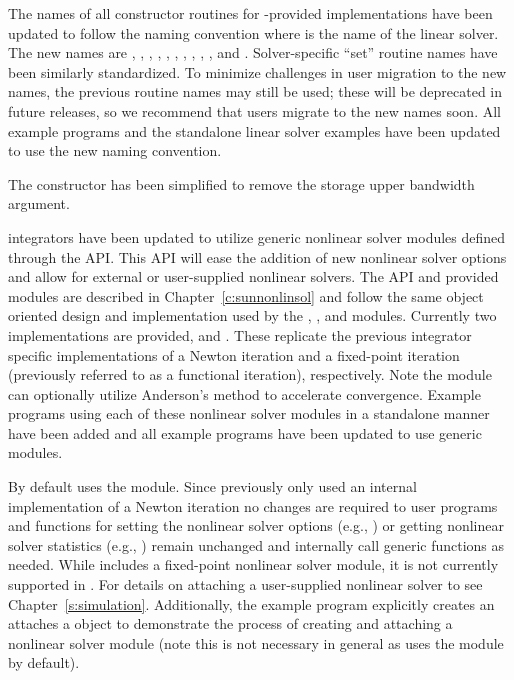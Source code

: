 The names of all constructor routines for {\sundials}-provided
{\sunlinsol} implementations have been updated to follow the naming convention
 where \id{*} is the name of the linear solver. The new names
are 
,
,
,
,\newline
{},
,
,
,
,
, and
.  Solver-specific ``set'' routine names have
been similarly standardized.  To minimize challenges in user migration
to the new names, the previous routine names may still be used; these
will be deprecated in future releases, so we recommend that users
migrate to the new names soon. All {\ida} example programs and the standalone
linear solver examples have been updated to use the new naming convention.

The  constructor has been simplified to remove the
storage upper bandwidth argument.

{\sundials} integrators have been updated to utilize generic nonlinear solver
modules defined through the {\sunnonlinsol} API. This API will ease the addition
of new nonlinear solver options and allow for external or user-supplied
nonlinear solvers. The {\sunnonlinsol} API and {\sundials} provided modules are
described in Chapter~\ref{c:sunnonlinsol} and follow the same object oriented
design and implementation used by the {\nvector}, {\sunmatrix}, and {\sunlinsol}
modules. Currently two {\sunnonlinsol} implementations are provided,
{\sunnonlinsolnewton} and {\sunnonlinsolfixedpoint}. These replicate the
previous integrator specific implementations of a Newton iteration and a
fixed-point iteration (previously referred to as a functional iteration),
respectively. Note the {\sunnonlinsolfixedpoint} module can optionally utilize
Anderson's method to accelerate convergence. Example programs using each of
these nonlinear solver modules in a standalone manner have been added and all
{\ida} example programs have been updated to use generic {\sunnonlinsol}
modules.

By default {\ida} uses the {\sunnonlinsolnewton} module. Since {\ida} previously
only used an internal implementation of a Newton iteration no changes are
required to user programs and functions for setting the nonlinear solver options
(e.g., ) or getting nonlinear solver statistics (e.g.,
) remain unchanged and internally call generic
{\sunnonlinsol} functions as needed. While {\sundials} includes a fixed-point
nonlinear solver module, it is not currently supported in {\ida}. For details on
attaching a user-supplied nonlinear solver to {\ida} see
Chapter~\ref{s:simulation}. Additionally, the example program
 explicitly creates an attaches a {\sunnonlinsolnewton}
object to demonstrate the process of creating and attaching a nonlinear solver
module (note this is not necessary in general as {\ida} uses the
{\sunnonlinsolnewton} module by default).

